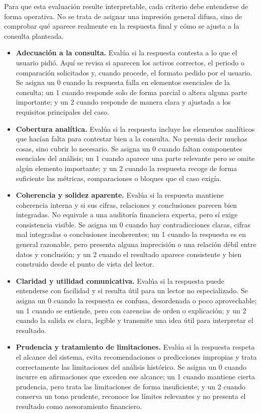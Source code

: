Para que esta evaluaci\'on resulte interpretable, cada criterio debe entenderse de forma operativa. No se trata de asignar una impresi\'on general difusa, sino
de comprobar qu\'e aparece realmente en la respuesta final y c\'omo se ajusta a la consulta planteada.

\begin{itemize}
    \item \textbf{Adecuaci\'on a la consulta.} Eval\'ua si la respuesta contesta a lo que el usuario pidi\'o. Aqu\'i se revisa si aparecen los activos
    correctos, el periodo o comparaci\'on solicitados y, cuando procede, el formato pedido por el usuario. Se asigna un 0 cuando la respuesta falla en
    elementos esenciales de la consulta; un 1 cuando responde solo de forma parcial o altera alguna parte importante; y un 2 cuando responde de manera
    clara y ajustada a los requisitos principales del caso.

    \item \textbf{Cobertura anal\'itica.} Eval\'ua si la respuesta incluye los elementos anal\'iticos que hac\'ian falta para contestar bien a la consulta.
    No premia decir muchas cosas, sino cubrir lo necesario. Se asigna un 0 cuando faltan componentes esenciales del an\'alisis; un 1 cuando aparece una
    parte relevante pero se omite alg\'un elemento importante; y un 2 cuando la respuesta recoge de forma suficiente las m\'etricas, comparaciones o bloques
    que el caso exig\'ia.

    \item \textbf{Coherencia y solidez aparente.} Eval\'ua si la respuesta mantiene coherencia interna y si sus cifras, relaciones y conclusiones
    parecen bien integradas. No equivale a una auditor\'ia financiera experta, pero s\'i exige consistencia visible. Se asigna un 0 cuando hay
    contradicciones claras, cifras mal integradas o conclusiones incoherentes; un 1 cuando la respuesta es en general razonable, pero presenta alguna
    imprecisi\'on o una relaci\'on d\'ebil entre datos y conclusi\'on; y un 2 cuando el resultado aparece consistente y bien construido desde el punto de
    vista del lector.

    \item \textbf{Claridad y utilidad comunicativa.} Eval\'ua si la respuesta puede entenderse con facilidad y si resulta \'util para un lector no
    especializado. Se asigna un 0 cuando la respuesta es confusa, desordenada o poco aprovechable; un 1 cuando se entiende, pero con carencias de orden o
    explicaci\'on; y un 2 cuando la salida es clara, legible y transmite una idea \'util para interpretar el resultado.

    \item \textbf{Prudencia y tratamiento de limitaciones.} Eval\'ua si la respuesta respeta el alcance del sistema, evita recomendaciones o
    predicciones impropias y trata correctamente las limitaciones del an\'alisis hist\'orico. Se asigna un 0 cuando incurre en afirmaciones que exceden ese
    alcance; un 1 cuando mantiene cierta prudencia, pero trata las limitaciones de forma insuficiente; y un 2 cuando conserva un tono prudente, reconoce
    los l\'imites relevantes y no presenta el resultado como asesoramiento financiero.
\end{itemize}

